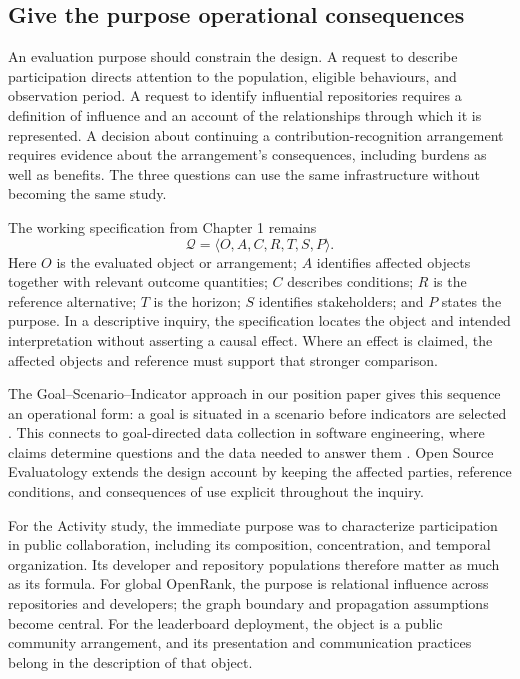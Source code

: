 \subsection{Give the purpose operational consequences}
An evaluation purpose should constrain the design. A request to describe participation directs attention to the population, eligible behaviours, and observation period. A request to identify influential repositories requires a definition of influence and an account of the relationships through which it is represented. A decision about continuing a contribution-recognition arrangement requires evidence about the arrangement's consequences, including burdens as well as benefits. The three questions can use the same infrastructure without becoming the same study.

The working specification from Chapter 1 remains
\[
\mathcal Q=\langle O,A,C,R,T,S,P\rangle.
\]
Here \(O\) is the evaluated object or arrangement; \(A\) identifies affected objects together with relevant outcome quantities; \(C\) describes conditions; \(R\) is the reference alternative; \(T\) is the horizon; \(S\) identifies stakeholders; and \(P\) states the purpose. In a descriptive inquiry, the specification locates the object and intended interpretation without asserting a causal effect. Where an effect is claimed, the affected objects and reference must support that stronger comparison.

The Goal--Scenario--Indicator approach in our position paper gives this sequence an operational form: a goal is situated in a scenario before indicators are selected \citep[Section 3.1.1]{han2024ose}. This connects to goal-directed data collection in software engineering, where claims determine questions and the data needed to answer them \citep{basili1984}. Open Source Evaluatology extends the design account by keeping the affected parties, reference conditions, and consequences of use explicit throughout the inquiry.

For the Activity study, the immediate purpose was to characterize participation in public collaboration, including its composition, concentration, and temporal organization. Its developer and repository populations therefore matter as much as its formula. For global OpenRank, the purpose is relational influence across repositories and developers; the graph boundary and propagation assumptions become central. For the leaderboard deployment, the object is a public community arrangement, and its presentation and communication practices belong in the description of that object.


